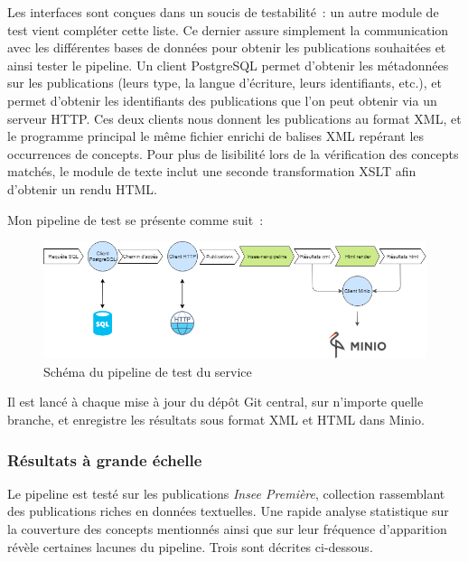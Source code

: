Les interfaces sont conçues dans un soucis de testabilité~: un autre module de test vient compléter cette liste. Ce dernier assure simplement la communication avec les différentes bases de données pour obtenir les publications souhaitées et ainsi tester le pipeline. Un client PostgreSQL permet d'obtenir les métadonnées sur les publications (leurs type, la langue d'écriture, leurs identifiants, etc.), et permet d'obtenir les identifiants des publications que l'on peut obtenir via un serveur HTTP. Ces deux clients nous donnent les publications au format XML, et le programme principal le même fichier enrichi de balises XML repérant les occurrences de concepts. Pour plus de lisibilité lors de la vérification des concepts matchés, le module de texte inclut une seconde transformation XSLT afin d'obtenir un rendu HTML.
\newline

Mon pipeline de test se présente comme suit~:
\vspace{10pt}
\begin{figure}[H]
    \centering
    \includegraphics[scale=0.56]{images/Pipeline-test.png}
    \caption{Schéma du pipeline de test du service}
    \label{fig:pipeline-test}
\end{figure}
\vspace{10pt}

Il est lancé à chaque mise à jour du dépôt Git central, sur n'importe quelle branche, et enregistre les résultats sous format XML et HTML dans Minio.
\newline

\subsubsection*{Résultats à grande échelle}
Le pipeline est testé sur les publications \textit{Insee Première}, collection rassemblant des publications riches en données textuelles. Une rapide analyse statistique sur la couverture des concepts mentionnés ainsi que sur leur fréquence d'apparition révèle certaines lacunes du pipeline. Trois sont décrites ci-dessous.
\newline

